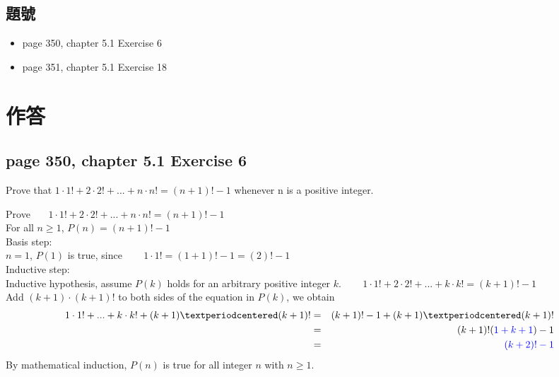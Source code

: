 \documentclass[sigconf]{acmart}
\newcommand{\answer}[2]{%
  \if\relax\detokenize{#2}\relax
    \underline{\mbox{請作答}}%
  \else
    \textcolor{blue}{#2}%
  \fi
}
\begin{document}
\subsection{題號}
\begin{shaded}
    \begin{itemize}
	\item[-] page 350, chapter 5.1 Exercise 6
    \item[-] page 351, chapter 5.1 Exercise 18
\end{itemize}
\end{shaded}

\section{作答}
\subsection{page 350, chapter 5.1 Exercise 6}
\begin{shaded}
    Prove that $1 \cdot 1! + 2 \cdot 2! + ... + n \cdot n! = (n + 1)! - 1$ whenever n is a positive integer.
\end{shaded}  
Prove ~~~$1 \cdot 1! + 2 \cdot 2! + ... + n \cdot n! = (n + 1)! - 1$ \\
For all $n \geq 1 $, $ P(n) = (n + 1)! - 1 $ \\
Basis step:\\
$n = 1$, $ P(1) $ is true, since ~~~ $ 1 \cdot 1! = (1 + 1)! - 1 = (2)! - 1 $ \\
Inductive step:\\
Inductive hypothesis, assume $ P(k) $ holds for an arbitrary positive integer $k$. ~~~  $1 \cdot 1! + 2 \cdot 2! + ... + k \cdot k! = (k + 1)! - 1 $\\
Add $ (k + 1) \cdot (k + 1)!$ to both sides of the equation in $ P(k) $, we obtain
\begin{eqnarray*}
1 \cdot 1!  + ... + k \cdot k! + (k + 1) · (k + 1)!  & = & (k + 1)! - 1 + (k + 1) · (k + 1)!\\
~ & = & (k + 1)!(\answer{5.1.6a}{1+k+1}) - 1 \\
~ & = & \answer{5.1.6b}{(k+2)!-1}
\end{eqnarray*}
By mathematical induction, $ P(n) $ is true for all integer $n$ with $n \geq 1 $.
\end{document}
